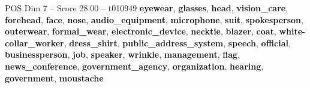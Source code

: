 \begin{textsample}{POS Dim 7 – Score 28.00 – t010949}  \label{ex:f7_pos_010}
\textbf{eyewear}, \textbf{glasses}, \textbf{head}, \textbf{vision\_care}, \textbf{forehead}, \textbf{face}, \textbf{nose}, \textbf{audio\_equipment}, \textbf{microphone}, \textbf{suit}, \textbf{spokesperson}, \textbf{outerwear}, \textbf{formal\_wear}, \textbf{electronic\_device}, \textbf{necktie}, \textbf{blazer}, \textbf{coat}, \textbf{white-collar\_worker}, \textbf{dress\_shirt}, \textbf{public\_address\_system}, \textbf{speech}, \textbf{official}, \textbf{businessperson}, \textbf{job}, \textbf{speaker}, \textbf{wrinkle}, \textbf{management}, \textbf{flag}, \textbf{news\_conference}, \textbf{government\_agency}, \textbf{organization}, \textbf{hearing}, \textbf{government}, \textbf{moustache}

\end{textsample}
